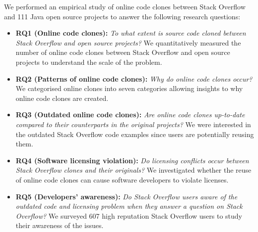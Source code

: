 \documentclass[10pt,journal,compsoc]{IEEEtran}
\begin{document}
We performed an empirical study of online code clones between Stack
Overflow and 111 Java open source projects to answer the following
research questions:
\begin{itemize}
	\item \textbf{RQ1 (Online code clones): }\textit{To what extent is source
		code cloned between Stack Overflow and open source projects?} We
	quantitatively measured the number of online code clones between Stack
	Overflow and open source projects to understand the scale of the
	problem. 
	\item \textbf{RQ2 (Patterns of online code clones): }\textit{Why do online
		code clones occur?} We categorised online clones into seven
	categories allowing insights to why online code clones are created.
	\item \textbf{RQ3 (Outdated online code clones): }\textit{Are
		online code clones up-to-date compared to their counterparts in the
		original projects?} We were interested in the outdated Stack
	Overflow code examples since users are potentially reusing
	them. 
	\item \textbf{RQ4 (Software licensing violation): }\textit{Do
		licensing conflicts occur between Stack Overflow clones and their
		originals?} We investigated whether the reuse of online code clones
	can cause software developers to violate licenses.
	\item \textbf{RQ5 (Developers' awareness): }\textit{Do Stack Overflow
		users aware of the outdated code and licensing problem when
		they answer a question on Stack Overflow?} 
	We surveyed 607 high reputation Stack Overflow users to study their
	awareness of the issues.
\end{itemize}
\end{document}
